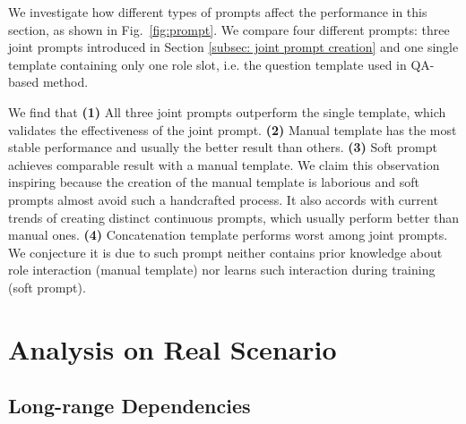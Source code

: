 \begin{figure*}[htbp]
\centering
{}%
%
%
\caption{Arg-C F1 using three different types of joint prompts in Table~\ref{tab: diff prompt} plus the single template on three benchmarks. \textbf{MA}: Manual Template. \textbf{SF}: Soft Prompt. \textbf{CA}: Concatenate Template. \textbf{single}: Single Template.}
\label{fig:prompt}
\end{figure*}

We investigate how different types of prompts affect the performance in this section, as shown in Fig.~\ref{fig:prompt}. We compare four different prompts: three joint prompts introduced in Section \ref{subsec: joint prompt creation} and one single template containing only one role slot, i.e. the question template used in QA-based method.

We find that \textbf{(1)} All three joint prompts outperform the single template, which validates the effectiveness of the joint prompt. \textbf{(2)} Manual template has the most stable performance and usually the better result than others. \textbf{(3)} Soft prompt achieves comparable result with a manual template. We claim this observation inspiring because the creation of the manual template is laborious and soft prompts almost avoid such a handcrafted process. It also accords with current trends of creating distinct continuous prompts, which usually perform better than manual ones. \textbf{(4)} Concatenation template performs worst among joint prompts. We conjecture it is due to such prompt neither contains prior knowledge about role interaction (manual template) nor learns such interaction during training (soft prompt). \section{Analysis on Real Scenario}
\subsection{Long-range Dependencies}

